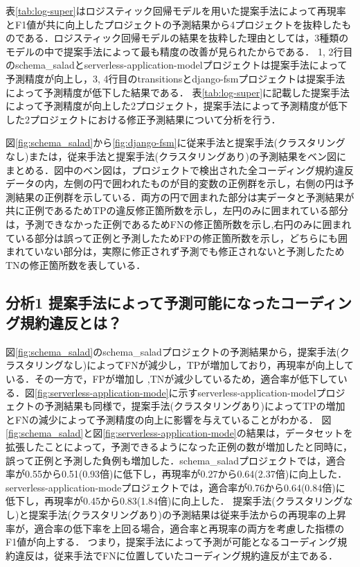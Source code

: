 \documentclass[11pt,dvipdfmx]{jreport}
\begin{document}
表\ref{tab:log-super}はロジスティック回帰モデルを用いた提案手法によって再現率とF1値が共に向上したプロジェクトの予測結果から4プロジェクトを抜粋したものである．ロジスティック回帰モデルの結果を抜粋した理由としては，3種類のモデルの中で提案手法によって最も精度の改善が見られたからである．
1, 2行目のschema\_saladとserverless-application-modelプロジェクトは提案手法によって予測精度が向上し，3, 4行目のtransitionsとdjango-fsmプロジェクトは提案手法によって予測精度が低下した結果である．
表\ref{tab:log-super}に記載した提案手法によって予測精度が向上した2プロジェクト，提案手法によって予測精度が低下した2プロジェクトにおける修正予測結果について分析を行う．

図\ref{fig:schema_salad}から\ref{fig:django-fsm}に従来手法と提案手法(クラスタリングなし)または，従来手法と提案手法(クラスタリングあり)の予測結果をベン図にまとめる．図中のベン図は，プロジェクトで検出された全コーディング規約違反データの内，左側の円で囲われたものが目的変数の正例群を示し，右側の円は予測結果の正例群を示している．両方の円で囲まれた部分は実データと予測結果が共に正例であるためTPの違反修正箇所数を示し，左円のみに囲まれている部分は，予測できなかった正例であるためFNの修正箇所数を示し,右円のみに囲まれている部分は誤って正例と予測したためFPの修正箇所数を示し，どちらにも囲まれていない部分は，実際に修正されず予測でも修正されないと予測したためTNの修正箇所数を表している．

\subsection*{分析1 提案手法によって予測可能になったコーディング規約違反とは？}

図\ref{fig:schema_salad}のschema\_saladプロジェクトの予測結果から，提案手法(クラスタリングなし)によってFNが減少し，TPが増加しており，再現率が向上している．その一方で，FPが増加し ,TNが減少しているため，適合率が低下している．図\ref{fig:serverless-application-mode}に示すserverless-application-modelプロジェクトの予測結果も同様で，提案手法(クラスタリングあり)によってTPの増加とFNの減少によって予測精度の向上に影響を与えていることがわかる．
図\ref{fig:schema_salad}と図\ref{fig:serverless-application-mode}の結果は，データセットを拡張したことによって，予測できるようになった正例の数が増加したと同時に，誤って正例と予測した負例も増加した．schema\_saladプロジェクトでは，適合率が0.55から0.51(0.93倍)に低下し，再現率が0.27から0.64(2.37倍)に向上した．serverless-application-modeプロジェクトでは，適合率が0.76から0.64(0.84倍)に低下し，再現率が0.45から0.83(1.84倍)に向上した．
提案手法(クラスタリングなし)と提案手法(クラスタリングあり)の予測結果は従来手法からの再現率の上昇率が，適合率の低下率を上回る場合，適合率と再現率の両方を考慮した指標のF1値が向上する．
つまり，提案手法によって予測が可能となるコーディング規約違反は，従来手法でFNに位置していたコーディング規約違反が主である．
\end{document}
